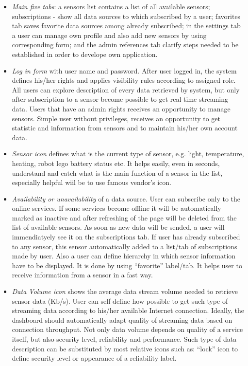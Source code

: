       \begin{itemize}
      \item \emph{Main five tabs}: a sensors list contains a list of all available sensors; subscriptions - show all data sources to which subscribed by a user; favorites tab saves favorite data sources among already subscribed; in the settings tab a user can manage own profile and also add new sensors by using corresponding form; and the admin references tab clarify steps needed to be established in order to develope own application.
      \item \emph{Log in form} with user name and password. After user logged in, the system defines his/her rights and applies visibility rules according to assigned role. All users can explore description of every data retrieved by system, but only after subscription to a sensor become possible to get real-time streaming data. Users that have an admin rights receives an opportunity to manage sensors. Simple user without privileges, receives an opportunity to get statistic and information from sensors and to maintain his/her own account data.
      \item \emph{Sensor icon} defines what is the current type of sensor, e.g. light, temperature, heating, robot lego battery status etc. It helps easily, even in seconds, understand and catch what is the main function of a sensor in the list, especially helpful wiil be to use famous vendor's icon.
      \item \emph{Availability or unavailability} of a data source. User can subscribe only to the online services. If some services become offline it will be automatically marked as inactive and after refreshing of the page will be deleted from the list of available sensors. As soon as new data will be sended, a user will immendiatyely see it on the subscriptions tab. If user has already subscribed to any sensor, this sensor automatically added to a list/tab of subscriptions made by user. Also a user can define hierarchy in which sensor information have to be displayed. It is done by using ``favorite'' label/tab. It helps user to receive information from a sensor in a fast way.
      \item \emph{Data Volume icon} shows the average data stream volume needed to retrieve sensor data (Kb/s). User can self-define how possible to get such type of streaming data according to his/her available Internet connection. Ideally, the dashboard should automatically adapt quality of streaming data based on connection throughput. Not only data volume depends on quality of a service itself, but also security level, reliability and performance. Such type of data description can be substituted by most relative icons such as: ``lock'' icon to define security level or appearance of a reliability label.

\end{itemize}
